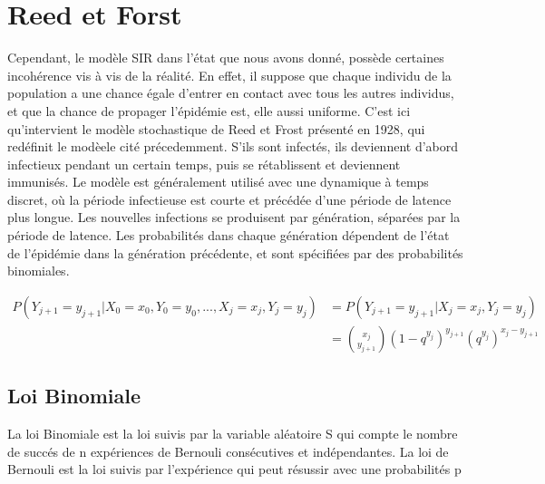 \section{Reed et Forst}

Cependant, le modèle SIR dans l’état que nous avons donné, possède certaines incohérence vis à vis
de la réalité. En effet, il suppose que chaque individu de la population a une chance égale d'entrer
en contact avec tous les autres individus, et que la chance de propager l’épidémie est, elle aussi uniforme.
C’est ici qu’intervient le modèle stochastique de Reed et Frost présenté en 1928, qui redéfinit le
modèele cité précedemment. S'ils sont infectés, ils deviennent d'abord infectieux pendant un certain
temps, puis se rétablissent et deviennent immunisés. Le modèle est généralement utilisé avec une
dynamique à temps discret, où la période infectieuse est courte et précédée d'une période de latence
plus longue. Les nouvelles infections se produisent par génération, séparées par la période de
latence. Les probabilités dans chaque génération dépendent de l'état de l'épidémie dans la
génération précédente, et sont spécifiées par des probabilités binomiales.

\begin{align}
P(Y_{j+1} = y_{j+1} | X_0 = x_0, Y_0 = y_0, ..., X_j = x_j, Y_j = y_j) &= P(Y_{j+1} = y_{j+1} | X_j = x_j, Y_j = y_j) \\
&= \binom{x_j}{y_{j+1}}(1 - q^{y_j})^{y_{j+1}}(q^{y_j})^{x_j - y_{j+1}}
\end{align}

\subsection{Loi Binomiale}

La loi Binomiale est la loi suivis par la variable aléatoire S qui compte le nombre de succés de n expériences de Bernouli consécutives et indépendantes.
La loi de Bernouli est la loi suivis par l'expérience qui peut résussir avec une probabilités p

